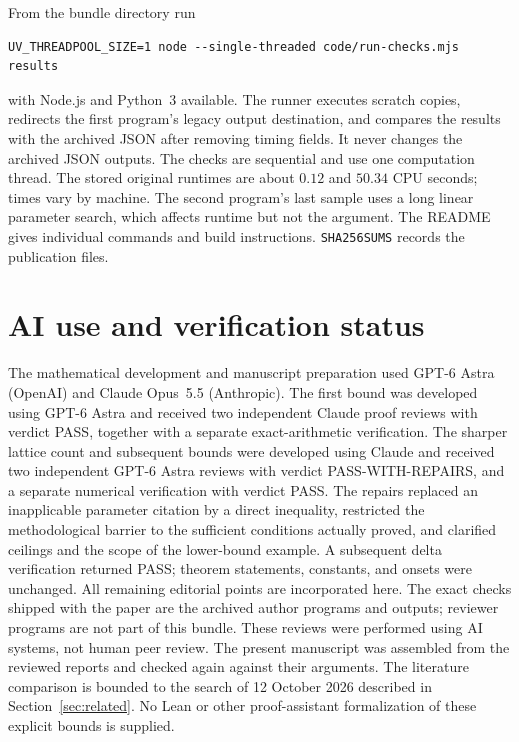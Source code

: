 \documentclass[11pt]{amsart}
\theoremstyle{remark}
\begin{document}
From the bundle directory run
\begin{verbatim}
UV_THREADPOOL_SIZE=1 node --single-threaded code/run-checks.mjs results
\end{verbatim}
with Node.js and Python~3 available. The runner executes scratch copies,
redirects the first program's legacy output destination, and compares
the results with the archived JSON after removing timing fields. It
never changes the archived JSON outputs. The checks are sequential and use
one computation thread. The stored original runtimes are about $0.12$
and $50.34$ CPU seconds; times vary by machine. The second program's
last sample uses a long linear parameter search, which affects runtime
but not the argument. The README gives individual commands and build
instructions. \texttt{SHA256SUMS} records the publication files.

\section*{AI use and verification status}
The mathematical development and manuscript preparation used GPT-6
Astra (OpenAI) and Claude Opus~5.5 (Anthropic). The first bound was
developed using GPT-6 Astra and received two independent Claude proof
reviews with verdict PASS, together with a separate exact-arithmetic
verification. The sharper lattice count and subsequent bounds were
developed using Claude and received two independent GPT-6 Astra
reviews with verdict PASS-WITH-REPAIRS, and a separate numerical
verification with verdict PASS. The repairs replaced an inapplicable
parameter citation by a direct inequality, restricted the methodological
barrier to the sufficient conditions actually proved, and clarified
ceilings and the scope of the lower-bound example. A subsequent delta
verification returned PASS; theorem statements, constants, and onsets
were unchanged. All remaining editorial points are incorporated here.
The exact checks shipped with the paper are the archived author
programs and outputs; reviewer programs are not part of this bundle.
These reviews were performed using AI systems, not human peer review.
The present manuscript was assembled from the reviewed reports and
checked again against their arguments. The literature comparison is
bounded to the search of 12 October 2026 described in
Section~\ref{sec:related}. No Lean or other proof-assistant
formalization of these explicit bounds is supplied.
\end{document}
